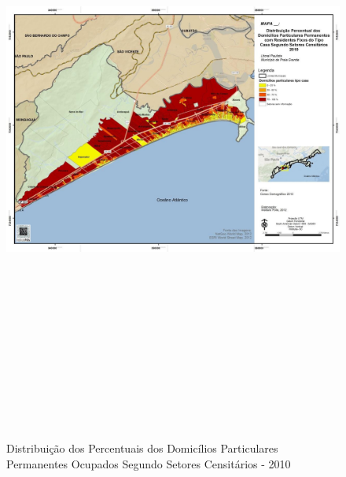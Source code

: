 	\begin{landscape}
		\begin{figure}[h]
			\centering
			\caption{Distribuição dos Percentuais dos Domicílios Particulares Permanentes Ocupados Segundo Setores Censitários - 2010}
			\includegraphics[width=20cm,height=20cm,keepaspectratio]{img/polis_fixos.png}
			\label{mapa_fixos}
		\end{figure}
	\end{landscape}

